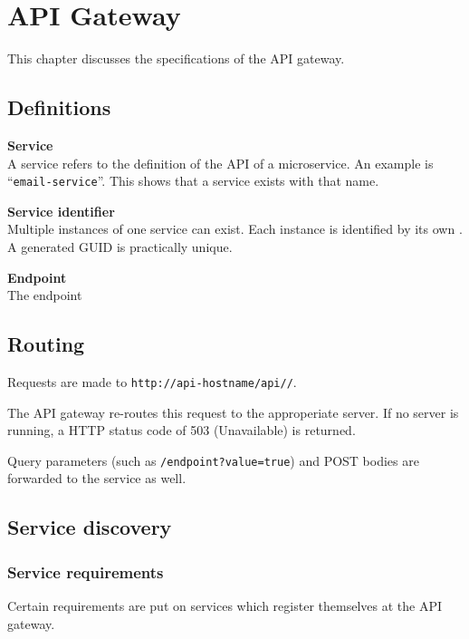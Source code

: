 \chapter{API Gateway}
This chapter discusses the specifications of the API gateway.

\section{Definitions}

\begin{teitemize}
    \item \textbf{Service}\\
    A service refers to the definition of the API of a microservice. An example is ``\texttt{email-service}''. This shows that a service exists with that name.
    \item \textbf{Service identifier}\\
    Multiple instances of one service can exist. Each instance is identified by its own . A generated GUID is practically unique.
    \item \textbf{Endpoint}\\
    The endpoint
\end{teitemize}
    
\section{Routing}
Requests are made to \texttt{http://api-hostname/api/}\texttt{/}.

The API gateway re-routes this request to the approperiate server. If no server is running, a HTTP status code of 503 (Unavailable) is returned.

Query parameters (such as \texttt{/endpoint?value=true}) and POST bodies are forwarded to the service as well.

\section{Service discovery}
\subsection{Service requirements}
Certain requirements are put on services which register themselves at the API gateway.

